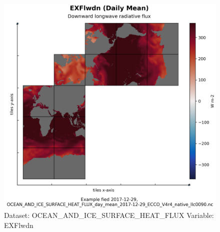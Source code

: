 \begin{figure}[H]
\centering
\includegraphics[width=\textwidth]{../images/plots/native_plots/Ocean_and_Sea-Ice_Surface_Heat_Fluxes/EXFlwdn.png}
\caption{Dataset: OCEAN\_AND\_ICE\_SURFACE\_HEAT\_FLUX Variable: EXFlwdn}
\label{tab:table-OCEAN_AND_ICE_SURFACE_HEAT_FLUX_EXFlwdn-Plot}
\end{figure}
\pagebreak
